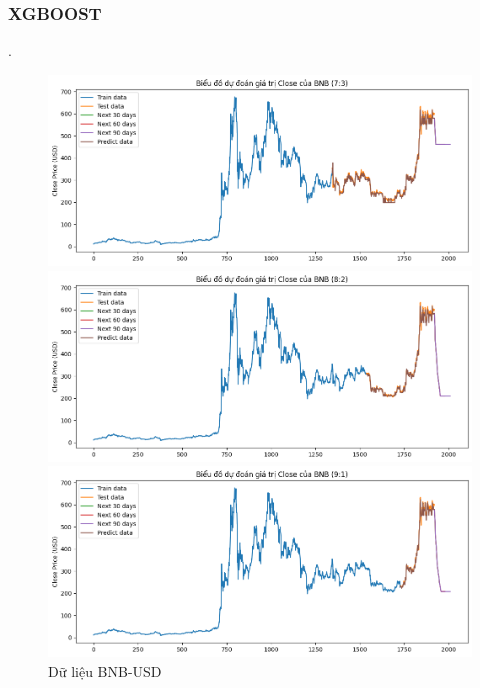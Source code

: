 \documentclass[conference]{IEEEtran}
\begin{document}
	\subsubsection{XGBOOST}.
	\begin{figure}[H]
		\centering
		\begin{minipage}{0.15\textwidth}
			\centering
			\includegraphics[width=1\textwidth]{Figure/XGB_BNB_73.png}
		\end{minipage}
		\hfill
		\begin{minipage}{0.15\textwidth}
			\centering
			\includegraphics[width=1\textwidth]{Figure/XGB_BNB_82.png}
		\end{minipage}
		\hfill
		\begin{minipage}{0.15\textwidth}
			\centering
			\includegraphics[width=1\textwidth]{Figure/XGB_BNB_91.png}
		\end{minipage}
		\caption{Dữ liệu BNB-USD}
		\label{fig:1}
	\end{figure}
\end{document}

